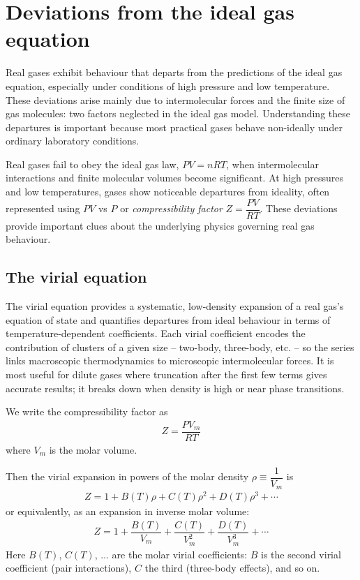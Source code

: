 \section{Deviations from the ideal gas equation}
    
    Real gases exhibit behaviour that departs from the predictions of the ideal gas equation, especially under conditions of high pressure and low temperature. These deviations arise mainly due to intermolecular forces and the finite size of gas molecules: two factors neglected in the ideal gas model. Understanding these departures is important because most practical gases behave non-ideally under ordinary laboratory conditions.
    
    Real gases fail to obey the ideal gas law, $PV=nRT$, when intermolecular interactions and finite molecular volumes become significant. At high pressures and low temperatures, gases show noticeable departures from ideality, often represented using $PV$ vs $P$ or \textit{compressibility factor} $Z=\dfrac{PV}{RT}$. These deviations provide important clues about the underlying physics governing real gas behaviour.
    
    \subsection{The virial equation}
    	The virial equation provides a systematic, low-density expansion of a real gas's equation of state and quantifies departures from ideal behaviour in terms of temperature-dependent coefficients. Each virial coefficient encodes the contribution of clusters of a given size -- two-body, three-body, etc. -- so the series links macroscopic thermodynamics to microscopic intermolecular forces. It is most useful for dilute gases where truncation after the first few terms gives accurate results; it breaks down when density is high or near phase transitions.
    
	    We write the compressibility factor as
	    \begin{align*}
	    	Z=\dfrac{PV_m}{RT}
	    \end{align*}
	    where $V_m$ is the molar volume.
	    
	    Then the virial expansion in powers of the molar density $\rho\equiv\dfrac{1}{V_m}$ is
	    \begin{align*}
	    	\boxed{Z=1+B(T)\rho+C(T)\rho^2+D(T)\rho^3+\cdots}
	    \end{align*}
	    or equivalently, as an expansion in inverse molar volume:
	    \begin{align*}
	    	\boxed{Z=1+\dfrac{B(T)}{V_m}+\dfrac{C(T)}{V_m^2}+\dfrac{D(T)}{V_m^3}+\cdots}
	    \end{align*}
	    Here $B(T)$, $C(T)$, $\dots$ are the molar virial coefficients: $B$ is the second virial coefficient (pair interactions), $C$ the third (three-body effects), and so on.
	    
